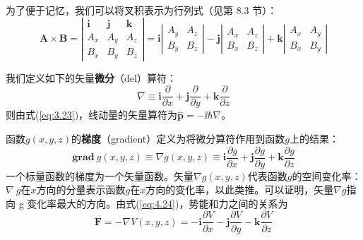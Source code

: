     为了便于记忆，我们可以将叉积表示为行列式（见第 8.3 节）：
    \begin{equation}
        \mathbf{A}\times\mathbf{B} = \left|
            \begin{array}{ccc}
            \mathbf{i} & \mathbf{j} & \mathbf{k} \\
            A_x & A_y & A_z \\
            B_x & B_y & B_z
            \end{array}
        \right| = \mathbf{i}\left|
            \begin{array}{ccc}
            A_y & A_z \\
            B_y & B_z
            \end{array}
        \right| - \mathbf{j}\left|
            \begin{array}{ccc}
            A_x & A_z \\
            B_x & B_z
            \end{array}
        \right| + \mathbf{k}\left|
            \begin{array}{ccc}
            A_x & A_y \\
            B_x & B_y
            \end{array}
        \right|
        \label{eq:5.28}
    \end{equation}

    我们定义如下的矢量\textbf{微分}（del）算符：
    \begin{equation}
        \boxed{
            \nabla \equiv \mathbf{i}\frac{\partial}{\partial x} + \mathbf{j}\frac{\partial}{\partial y} + \mathbf{k}\frac{\partial}{\partial z}
        }
        \label{eq:5.29}
    \end{equation}
    则由式(\ref{eq:3.23})，线动量的矢量算符为$\hat{\mathbf{p}}=-\ii \hbar\nabla$。

    函数$g\left(x,y,z\right)$的\textbf{梯度}（gradient）定义为将微分算符作用到函数$g$上的结果：
    \begin{equation}
        \boxed{
            \mathbf{grad} \: g\left(x,y,z\right) \equiv \nabla g\left(x,y,z\right) \equiv \mathbf{i}\frac{\partial g}{\partial x} + \mathbf{j}\frac{\partial g}{\partial y} + \mathbf{k}\frac{\partial g}{\partial z}
        }
        \label{eq:5.30}
    \end{equation}
    一个标量函数的梯度为一个矢量函数。矢量$\nabla g\left(x,y,z\right)$代表函数$g$的空间变化率：$\nabla \:g$在$x$方向的分量表示函数$g$在$x$方向的变化率，以此类推。可以证明，矢量$\nabla g$指向 g 变化率最大的方向。由式(\ref{eq:4.24})，势能和力之间的关系为
    \begin{equation}
        \mathbf{F} = -\nabla V\left(x,y,z\right) = -\mathbf{i}\frac{\partial V}{\partial x} - \mathbf{j}\frac{\partial V}{\partial y} - \mathbf{k}\frac{\partial V}{\partial z}
        \label{eq:5.31}
    \end{equation}

